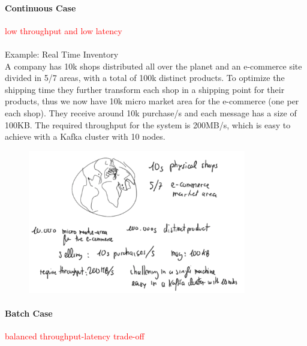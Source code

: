 \documentclass[10pt,a4paper]{article}
\newcommand{\nline}{\\~\\}
\begin{document}
\paragraph{Continuous Case} \textcolor{red}{low throughput and low latency} \nline
Example: Real Time Inventory \\
A company has 10k shops distributed all over the planet and an e-commerce site divided in 5/7 areas, with a total of 100k distinct products. To optimize the shipping time they further transform each shop in a shipping point for their products, thus we now have 10k micro market area for the e-commerce (one per each shop). They receive around 10k purchase/s and each message has a size of 100KB. The required throughput for the system is 200MB/s, which is easy to achieve with a Kafka cluster with 10 nodes.
\begin{figure}[ht!]
 \hfill \includegraphics[width=270pt]{images/continuous.png}\hspace*{\fill}
\end{figure}  

\paragraph{Batch Case} \textcolor{red}{balanced throughput-latency trade-off} \nline
\end{document}
